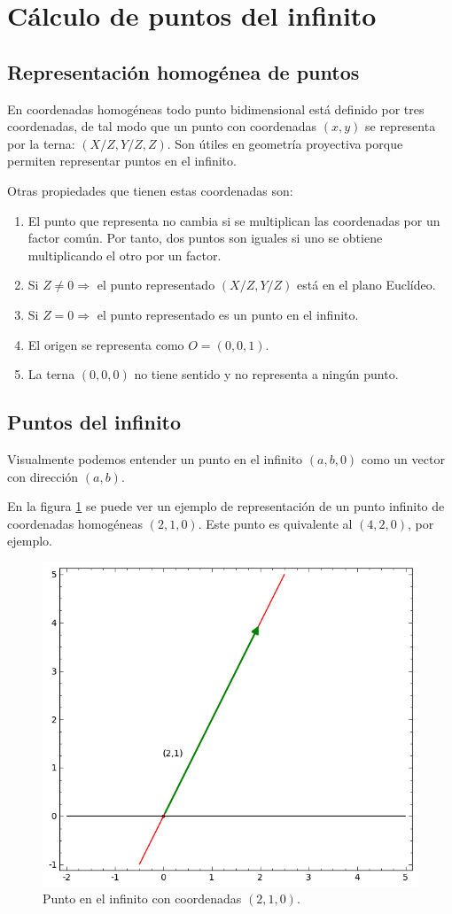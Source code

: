 \documentclass[a4,12pt]{article}
\begin{document}
\newpage
\section{Cálculo de puntos del infinito}
\subsection{Representación homogénea de puntos}
En coordenadas homogéneas todo punto bidimensional está definido por tres coordenadas, de tal modo que un punto con coordenadas $(x, y)$ se representa por la terna: $(X/Z, Y/Z, Z)$. Son útiles en geometría proyectiva porque permiten representar puntos en el infinito.

Otras propiedades que tienen estas coordenadas son:
\begin{enumerate}
\item El punto que representa no cambia si se multiplican las coordenadas por un factor común. Por tanto, dos puntos son iguales si uno se obtiene multiplicando el otro por un factor.
\item Si $Z\neq0 \Rightarrow$ el punto representado $(X/Z, Y/Z)$ está en el plano Euclídeo.
\item Si $Z=0\Rightarrow$ el punto representado es un punto en el infinito.
\item El origen se representa como $O=(0,0,1)$.
\item La terna $(0,0,0)$ no tiene sentido y no representa a ningún punto.
\end{enumerate}

\subsection{Puntos del infinito}

Visualmente podemos entender un punto en el infinito $(a,b,0)$ como un vector con dirección $(a,b)$.

En la figura \ref{fig:puntoinfinito} se puede ver un ejemplo de representación de un punto infinito de coordenadas homogéneas $(2,1,0)$. Este punto es quivalente al $(4,2,0)$, por ejemplo.

\begin{figure}
\begin{center}
\includegraphics[width=.5\linewidth]{imagenes/puntoinfinito}
\end{center}
\caption{Punto en el infinito con coordenadas $(2,1,0)$.}
\label{fig:puntoinfinito}
\end{figure}
\end{document}
